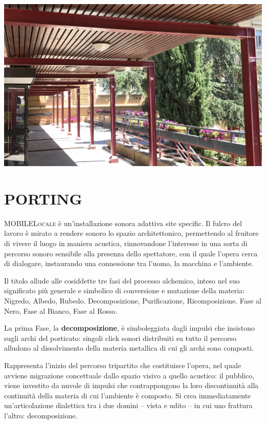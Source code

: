 \documentclass[
	a0,
	portrait
	]{a0poster}
\begin{document}
\begin{multicols}{4}
\vfill

~

\columnbreak


\begin{center}
\includegraphics[width=1.\linewidth]{panariello_Solenoidi_sugli_archi}
\end{center}

\section*{\color{cyellow}PORTING}

\lettrine{MOBILE}{Locale} è un’installazione sonora adattiva site specific. Il fulcro del lavoro è mirato a rendere sonoro lo spazio architettonico, permettendo al fruitore di vivere il luogo in maniera acustica, rinnovandone l’interesse in una sorta di percorso sonoro sensibile alla presenza dello spettatore, con il quale l’opera cerca di dialogare, instaurando una connessione tra l’uomo, la macchina e l'ambiente.

Il titolo allude alle cosiddette tre fasi del processo alchemico, inteso nel suo significato più generale e simbolico di conversione e mutazione della materia: Nigredo, Albedo, Rubedo. Decomposizione, Purificazione, Ricomposizione. Fase al Nero, Fase al Bianco, Fase al Rosso.

La prima Fase, la \textbf{decomposizione}, è simboleggiata dagli impulsi che insistono sugli archi del porticato: singoli click sonori distribuiti su tutto il percorso alludono al dissolvimento della materia metallica di cui gli archi sono composti.

Rappresenta l’inizio del percorso tripartito che costituisce l’opera, nel quale avviene migrazione concettuale dallo spazio visivo a quello acustico: il pubblico, viene investito da nuvole di impulsi che contrappongono la loro discontinuità alla continuità della materia di cui l'ambiente è composto. Si crea immediatamente un’articolazione dialettica tra i due domini – vista e udito – in cui uno frattura l’altro: decomposizione.


\end{multicols}
\end{document}

